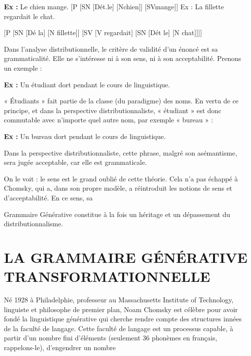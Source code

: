 \noindent\textbf{Ex :} Le chien mange. [P [SN [Dét.le] [Nchien]] [SVmange]] Ex : La fillette regardait le chat.\par

[P [SN [Dé la] [N fillette]] [SV [V regardait] [SN [Dét le] [N chat]]]]\par

Dans l’analyse distributionnelle, le critère de validité d’un énoncé est sa grammaticalité. Elle ne s’intéresse ni à son sens, ni à son acceptabilité. Prenons un exemple :\par

\noindent\textbf{Ex :} Un étudiant dort pendant le cours de linguistique.\par

« Étudiants » fait partie de la classe (du paradigme) des noms. En vertu de ce principe, et dans la perspective distributionnaliste, « étudiant » est donc commutable avec n’importe quel autre nom, par exemple « bureau » :\par

\noindent\textbf{Ex :} Un bureau dort pendant le cours de linguistique.\par

Dans la perspective distributionnaliste, cette phrase, malgré son asémantisme, sera jugée acceptable, car elle est grammaticale.\par

On le voit : le sens est le grand oublié de cette théorie. Cela n’a pas échappé à Chomsky, qui a, dans son propre modèle, a réintroduit les notions de sens et d’acceptabilité. En ce sens, sa\par

Grammaire Générative constitue à la fois un héritage et un dépassement du distributionnalisme.\par

\section{LA GRAMMAIRE GÉNÉRATIVE TRANSFORMATIONNELLE}

Né 1928 à Philadelphie, professeur au Massachusetts Institute of Technology, linguiste et philosophe de premier plan, Noam Chomsky est célèbre pour avoir fondé la linguistique générative qui cherche rendre compte des structures innées de la faculté de langage. Cette faculté de langage est un processus capable, à partir d’un nombre fini d'éléments (seulement 36 phonèmes en français, rappelons-le), d’engendrer un nombre\par

